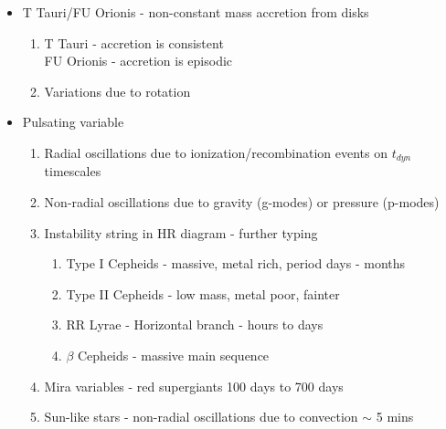 \documentclass{article}
\begin{document}
\begin{itemize}
        \item T Tauri/FU Orionis - non-constant mass accretion from disks
        \begin{enumerate}
            \item T Tauri - accretion is consistent\\
            FU Orionis - accretion is episodic
            \item Variations due to rotation
        \end{enumerate}

        \item Pulsating variable

        \begin{enumerate}
            \item Radial oscillations due to ionization/recombination events on $t_{dyn}$ timescales

            \item Non-radial oscillations due to gravity (g-modes) or pressure (p-modes)

            \item Instability string in HR diagram - further typing

            \begin{enumerate}
                \item Type I Cepheids - massive, metal rich, period days - months

                \item Type II Cepheids - low mass, metal poor, fainter

                \item RR Lyrae - Horizontal branch - hours to days

                \item $\beta$ Cepheids - massive main sequence
            \end{enumerate}

            \item Mira variables - red supergiants 100 days to 700 days

            \item Sun-like stars - non-radial oscillations due to convection $\sim$ 5 mins
        \end{enumerate}
\end{itemize}
\end{document}

